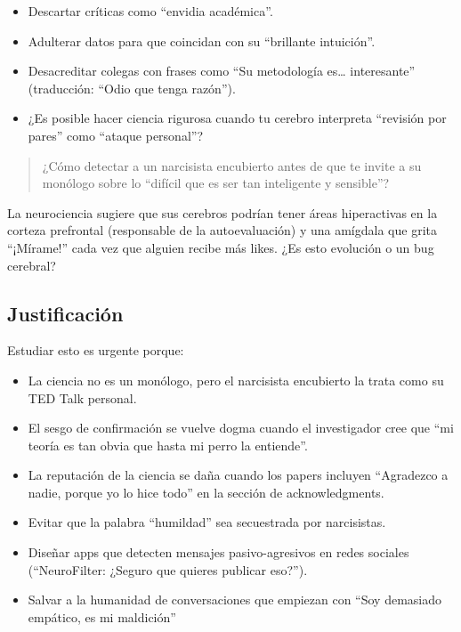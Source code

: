 \documentclass[
]{article}
\providecommand{\tightlist}{%
  \setlength{\itemsep}{0pt}\setlength{\parskip}{0pt}}\usepackage{longtable,booktabs,array}
\begin{document}
\begin{itemize}
\tightlist
\item
  Descartar críticas como ``envidia académica''.
\item
  Adulterar datos para que coincidan con su ``brillante intuición''.
\item
  Desacreditar colegas con frases como ``Su metodología es\ldots{}
  interesante'' (traducción: ``Odio que tenga razón'').
\item
  ¿Es posible hacer ciencia rigurosa cuando tu cerebro interpreta
  ``revisión por pares'' como ``ataque personal''?
\end{itemize}

\begin{quote}
¿Cómo detectar a un narcisista encubierto antes de que te invite a su
monólogo sobre lo ``difícil que es ser tan inteligente y sensible''?
\end{quote}

La neurociencia sugiere que sus cerebros podrían tener áreas
hiperactivas en la corteza prefrontal (responsable de la autoevaluación)
y una amígdala que grita ``¡Mírame!'' cada vez que alguien recibe más
likes. ¿Es esto evolución o un bug cerebral?

\subsection{Justificación}\label{justificaciuxf3n}

Estudiar esto es urgente porque:

\begin{itemize}
\tightlist
\item
  La ciencia no es un monólogo, pero el narcisista encubierto la trata
  como su TED Talk personal.
\item
  El sesgo de confirmación se vuelve dogma cuando el investigador cree
  que ``mi teoría es tan obvia que hasta mi perro la entiende''.
\item
  La reputación de la ciencia se daña cuando los papers incluyen
  ``Agradezco a nadie, porque yo lo hice todo'' en la sección de
  acknowledgments.
\item
  Evitar que la palabra ``humildad'' sea secuestrada por narcisistas.
\item
  Diseñar apps que detecten mensajes pasivo-agresivos en redes sociales
  (``NeuroFilter: ¿Seguro que quieres publicar eso?'').
\item
  Salvar a la humanidad de conversaciones que empiezan con ``Soy
  demasiado empático, es mi maldición''
\end{itemize}
\end{document}
